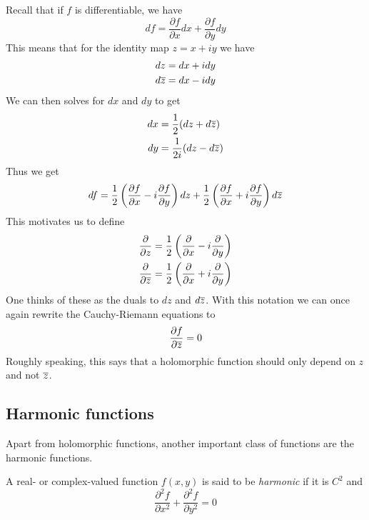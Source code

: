 Recall that if $f$ is differentiable, we have
$$df = \frac{\partial f}{\partial x}dx + \frac{\partial f}{\partial y}dy$$
This means that for the identity map $z = x + iy$ we have
\begin{align*}
    dz &= dx + idy\\
    d\overline{z} &= dx - idy
\end{align*}
We can then solves for $dx$ and $dy$ to get
\begin{align*}
    dx &= \frac{1}{2}(dz + d\overline{z})\\
    dy &= \frac{1}{2i}(dz - d\overline{z})
\end{align*}
Thus we get
$$df = \frac{1}{2}\left( \frac{\partial f}{\partial x} - i \frac{\partial f}{\partial y} \right)dz + \frac{1}{2} \left( \frac{\partial f}{\partial x} + i \frac{\partial f}{\partial y} \right) d \overline{z}$$
This motivates us to define
\begin{align*}
    \frac{\partial}{\partial z} &= \frac{1}{2} \left( \frac{\partial}{\partial x} - i \frac{\partial}{\partial y} \right)\\
    \frac{\partial}{\partial \overline{z}} &= \frac{1}{2} \left( \frac{\partial}{\partial x} + i \frac{\partial}{\partial y} \right)
\end{align*}
One thinks of these as the duals to $dz$ and $d\overline{z}$. With this notation we can once again rewrite the Cauchy-Riemann equations to 
$$\frac{\partial f}{\partial \overline{z}} = 0$$
Roughly speaking, this says that a holomorphic function should only depend on $z$ and not $\overline{z}$.

\subsection{Harmonic functions}
Apart from holomorphic functions, another important class of functions are the harmonic functions.
\begin{definition}
A real- or complex-valued function $f(x, y)$ is said to be \textit{harmonic} if it is $C^2$ and
$$\frac{\partial^2 f}{\partial x^2} + \frac{\partial^2 f}{\partial y^2} = 0$$
\end{definition}

